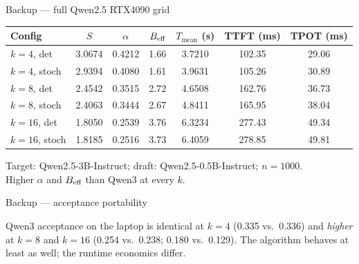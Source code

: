 \documentclass[aspectratio=169, 11pt]{beamer}
\begin{document}
\begin{frame}{Backup --- full Qwen2.5 RTX4090 grid}
  \centering
  \small
  \begin{tabular}{lcccccc}
    \toprule
    \textbf{Config} & $S$ & $\alpha$ & $B_{\text{eff}}$ & $T_{\text{mean}}$ (s)
    & TTFT (ms) & TPOT (ms)\\
    \midrule
    $k{=}4$, det   & 3.0674 & 0.4212 & 1.66 & 3.7210 & 102.35 & 29.06\\
    $k{=}4$, stoch & 2.9394 & 0.4080 & 1.61 & 3.9631 & 105.26 & 30.89\\
    $k{=}8$, det   & 2.4542 & 0.3515 & 2.72 & 4.6508 & 162.76 & 36.73\\
    $k{=}8$, stoch & 2.4063 & 0.3444 & 2.67 & 4.8411 & 165.95 & 38.04\\
    $k{=}16$, det  & 1.8050 & 0.2539 & 3.76 & 6.3234 & 277.43 & 49.34\\
    $k{=}16$, stoch& 1.8185 & 0.2516 & 3.73 & 6.4059 & 278.85 & 49.81\\
    \bottomrule
  \end{tabular}
  \vspace{6pt}

  \small Target: Qwen2.5-3B-Instruct; draft: Qwen2.5-0.5B-Instruct; $n{=}1000$.\\
  Higher $\alpha$ and $B_{\text{eff}}$ than Qwen3 at every $k$.
\end{frame}

\begin{frame}{Backup --- acceptance portability}
  \centering
  \panelC[0.62\linewidth]
  \vspace{2pt}

  \small Qwen3 acceptance on the laptop is identical at $k{=}4$ (0.335 vs.\
  0.336) and \emph{higher} at $k{=}8$ and $k{=}16$ (0.254 vs.\ 0.238; 0.180
  vs.\ 0.129). The algorithm behaves at least as well; the
  \alert{runtime economics} differ.
\end{frame}
\end{document}
